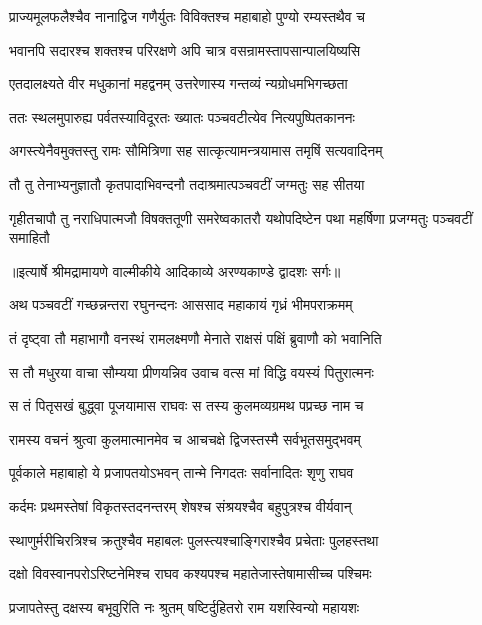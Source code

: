 \twolineshloka
{प्राज्यमूलफलैश्चैव नानाद्विज गणैर्युतः}
{विविक्तश्च महाबाहो पुण्यो रम्यस्तथैव च} %

\twolineshloka
{भवानपि सदारश्च शक्तश्च परिरक्षणे}
{अपि चात्र वसन्रामस्तापसान्पालयिष्यसि} %

\twolineshloka
{एतदालक्ष्यते वीर मधुकानां महद्वनम्}
{उत्तरेणास्य गन्तव्यं न्यग्रोधमभिगच्छता} %

\twolineshloka
{ततः स्थलमुपारुह्य पर्वतस्याविदूरतः}
{ख्यातः पञ्चवटीत्येव नित्यपुष्पितकाननः} %

\twolineshloka
{अगस्त्येनैवमुक्तस्तु रामः सौमित्रिणा सह}
{सात्कृत्यामन्त्रयामास तमृषिं सत्यवादिनम्} %

\twolineshloka
{तौ तु तेनाभ्यनुज्ञातौ कृतपादाभिवन्दनौ}
{तदाश्रमात्पञ्चवटीं जग्मतुः सह सीतया} %

\fourlineindentedshloka
{गृहीतचापौ तु नराधिपात्मजौ}
{विषक्ततूणी समरेष्वकातरौ}
{यथोपदिष्टेन पथा महर्षिणा}
{प्रजग्मतुः पञ्चवटीं समाहितौ} %


{॥इत्यार्षे श्रीमद्रामायणे वाल्मीकीये आदिकाव्ये अरण्यकाण्डे द्वादशः सर्गः॥}


\twolineshloka
{अथ पञ्चवटीं गच्छन्नन्तरा रघुनन्दनः}
{आससाद महाकायं गृध्रं भीमपराक्रमम्} %

\twolineshloka
{तं दृष्ट्वा तौ महाभागौ वनस्थं रामलक्ष्मणौ}
{मेनाते राक्षसं पक्षिं ब्रुवाणौ को भवानिति} %

\twolineshloka
{स तौ मधुरया वाचा सौम्यया प्रीणयन्निव}
{उवाच वत्स मां विद्धि वयस्यं पितुरात्मनः} %

\twolineshloka
{स तं पितृसखं बुद्ध्वा पूजयामास राघवः}
{स तस्य कुलमव्यग्रमथ पप्रच्छ नाम च} %

\twolineshloka
{रामस्य वचनं श्रुत्वा कुलमात्मानमेव च}
{आचचक्षे द्विजस्तस्मै सर्वभूतसमुद्भवम्} %

\twolineshloka
{पूर्वकाले महाबाहो ये प्रजापतयोऽभवन्}
{तान्मे निगदतः सर्वानादितः शृणु राघव} %

\twolineshloka
{कर्दमः प्रथमस्तेषां विकृतस्तदनन्तरम्}
{शेषश्च संश्रयश्चैव बहुपुत्रश्च वीर्यवान्} %

\twolineshloka
{स्थाणुर्मरीचिरत्रिश्च क्रतुश्चैव महाबलः}
{पुलस्त्यश्चाङ्गिराश्चैव प्रचेताः पुलहस्तथा} %

\twolineshloka
{दक्षो विवस्वानपरोऽरिष्टनेमिश्च राघव}
{कश्यपश्च महातेजास्तेषामासीच्च पश्चिमः} %

\twolineshloka
{प्रजापतेस्तु दक्षस्य बभूवुरिति नः श्रुतम्}
{षष्टिर्दुहितरो राम यशस्विन्यो महायशः} %

